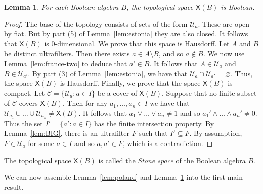 \documentclass[a4paper]{amsart}
\newtheorem{lemma}[theorem]{Lemma}
\begin{document}
\begin{lemma}\label{lem:Boolean-space} 
For each Boolean algebra $B$, the topological space $\mathsf{X}(B)$ is Boolean.
\end{lemma}
\begin{proof} The base of the topology consists of sets of the form $\mathscr{U}_{a}$.
These are open by fiat.
But by  part (5) of Lemma~\ref{lem:estonia} they are also closed.
It follows that $\mathsf{X}(B)$ is $0$-dimensional.
We prove that this space is Hausdorff.
Let $A$ and $B$ be distinct ultrafilters.
Then there exists $a \in A \setminus B$, and so $a \notin B$.
We now use Lemma~\ref{lem:france-two} to deduce that $a' \in B$. 
It follows that $A \in \mathscr{U}_{a}$ and $B \in \mathscr{U}_{a'}$.
By part (3) of Lemma~\ref{lem:estonia}, 
we have that $\mathscr{U}_{a} \cap \mathscr{U}_{a'} = \varnothing$.
Thus, the space $\mathsf{X}(B)$ is Hausdorff.
Finally, we prove that the space $\mathsf{X}(B)$ is compact.
Let $\mathscr{C} = \{\mathscr{U}_{a} \colon a \in I \}$ be a cover of $\mathsf{X}(B)$.
Suppose that no finite subset of $\mathscr{C}$ covers $\mathsf{X}(B)$.
Then for any $a_{1}, \ldots, a_{n} \in I$ we have that $\mathscr{U}_{a_{1}} \cup \ldots \cup \mathscr{U}_{a_{n}} \neq \mathsf{X}(B)$.
It follows that $a_{1} \vee \ldots \vee a_{n} \neq 1$ and so $a_{1}' \wedge \ldots \wedge a_{n}' \neq 0$.
Thus the set $I' = \{a' \colon a \in I\}$ has the finite intersection property.
By Lemma~\ref{lem:BIG}, there is an ultrafilter $F$ such that $I' \subseteq F$.
By assumption, $F \in \mathscr{U}_{a}$ for some $a \in I$ and so $a,a' \in F$, which is a contradiction.
\end{proof}

The topological space $\mathsf{X}(B)$ is called the {\em Stone space} of the Boolean algebra $B$.

We can now assemble Lemma~\ref{lem:poland} and Lemma~\ref{lem:Boolean-space} into the first main result.
\end{document}
